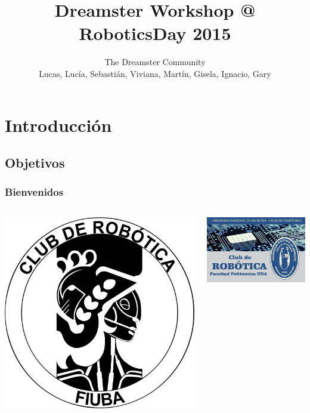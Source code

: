\documentclass[compress]{beamer}
\title[Dreamster Workshop]{Dreamster Workshop @ RoboticsDay 2015}
\author[Robotics Day]
{
The Dreamster Community \\
Lucas, Lucía, Sebastián, Viviana, Martín, Gisela, Ignacio, Gary
}
\begin{document}
\frame{\titlepage}

\section{Introducción}
\subsection{Objetivos}

\begin{frame}
 \frametitle{Bienvenidos}

\begin{columns}
\begin{center}
 \includegraphics[width=\columnwidth]{./img/cdrfiuba.png}
\end{center}
\begin{center}
 \includegraphics[width=\columnwidth]{./img/py.jpg}
\end{center}
\end{columns}

\end{frame}
\end{document}
